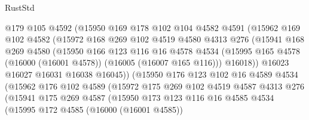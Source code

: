 \begin{lexlean}{RustStd}
\begin{coremodule}
                    @179
                    @105
                    @4592
                    (@15950
                      @169
                      @178
                      @102
                      @104
                      @4582
                      @4591
                      (@15962
                        @169
                        @102
                        @4582
                        (@15972
                          @168
                          @269
                          @102
                          @4519
                          @4580
                          @4313
                          @276
                          (@15941
                            @168
                            @269
                            @4580
                            (@15950
                              @166
                              @123
                              @116
                              @16
                              @4578
                              @4534
                              (@15995
                                @165
                                @4578
                                (@16000 (@16001 @4578))
                                (@16005 (@16007 @165 @116)))
                              @16018))
                          @16023
                          @16027
                          @16031
                          @16038
                          @16045))
                      (@15950
                        @176
                        @123
                        @102
                        @16
                        @4589
                        @4534
                        (@15962
                          @176
                          @102
                          @4589
                          (@15972
                            @175
                            @269
                            @102
                            @4519
                            @4587
                            @4313
                            @276
                            (@15941
                              @175
                              @269
                              @4587
                              (@15950
                                @173
                                @123
                                @116
                                @16
                                @4585
                                @4534
                                (@15995
                                  @172
                                  @4585
                                  (@16000 (@16001 @4585))

\end{coremodule}
\end{lexlean}
